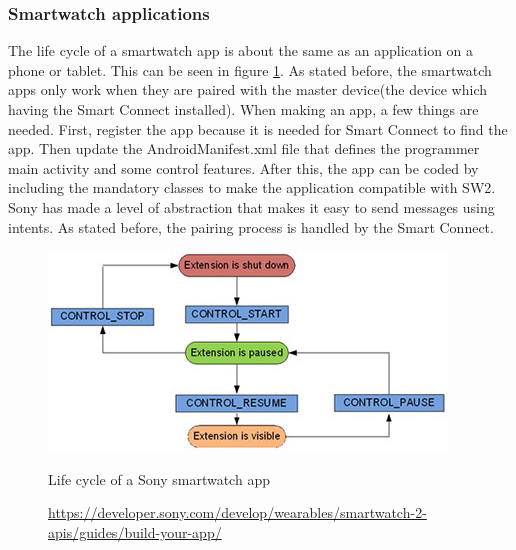 \subsubsection{Smartwatch applications}
\label{subsubsec:sw_app}
The life cycle of a smartwatch app is about the same as an application on a phone or tablet. This can be seen in figure \ref{fig:sw2_lifecycle}. As stated before, the smartwatch apps only work when they are paired with the master device(the device which having the Smart Connect installed). When making an app, a few things are needed. First, register the app because it is needed for Smart Connect to find the app. \pend
Then update the AndroidManifest.xml file that defines the programmer main activity and some control features. After this, the app can be coded by including the mandatory classes to make the application compatible with SW2. \pend  
Sony has made a level of abstraction that makes it easy to send messages using intents. As stated before, the pairing process is handled by the Smart Connect. 
\begin{figure}
\begin{center}
\includegraphics[scale=0.5]{images/applifecycle.jpg}
\end{center}
  \caption{Life cycle of a Sony smartwatch app}
  \label{fig:sw2_lifecycle}
  \caption*{\url{https://developer.sony.com/develop/wearables/smartwatch-2-apis/guides/build-your-app/}}
\end{figure}